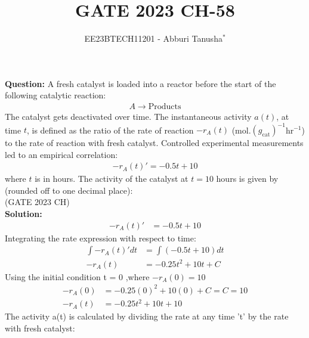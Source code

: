 \documentclass[journal,12pt,twocolumn]{IEEEtran}
\theoremstyle{remark}
\begin{document}

\vspace{3cm}

\title{GATE 2023 CH-58}
\author{EE23BTECH11201 - Abburi Tanusha$^{*}$%
}
\maketitle
\newpage
\bigskip

\renewcommand{\thefigure}{\theenumi}
\renewcommand{\thetable}{\theenumi}

\vspace{3cm}

\maketitle
\textbf{Question:} 
A fresh catalyst is loaded into a reactor before the start of the following catalytic reaction:
\begin{align*}
  A \rightarrow \text{Products} 
\end{align*}
The catalyst gets deactivated over time. The instantaneous activity $a(t)$, at time $t$, is defined as the ratio of the rate of reaction $-r_A(t)$ (mol.$(g_{\text{cat}})^{-1}$hr$^{-1}$) to the rate of reaction with fresh catalyst. Controlled experimental measurements led to an empirical correlation:
\begin{align*}
 -r_A(t)' = -0.5t + 10
 \end{align*}
where $t$ is in hours.
The activity of the catalyst at $t=10$ hours is given by (rounded off to one decimal place):\\
\hfill(GATE 2023 CH)\\
\textbf{Solution:} 
\begin{align}
 -r_A(t)' &= -0.5t + 10 
 \end{align}
Integrating the rate expression with respect to time:
\begin{align}
 \int -r_A(t)' dt &= \int (-0.5t + 10) dt \\
 -r_A(t) &= -0.25t^2 + 10t + C 
 \end{align}
Using the initial condition t = 0 ,where $-r_A(0) = 10$ \\
\begin{align}
 -r_A(0) &= -0.25(0)^2 + 10(0) + C = C = 10 \\
 -r_A(t) &= -0.25t^2 + 10t + 10 
 \end{align}
The activity a(t) is calculated by dividing the rate at any time 't' by the rate with fresh catalyst:\\
\end{document}
